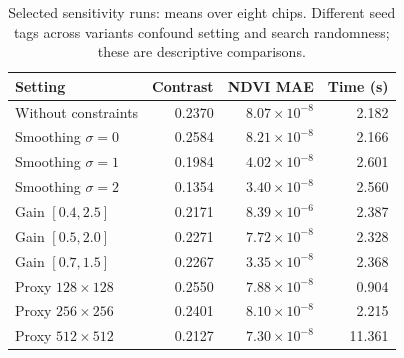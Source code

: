 \begin{table}[t]\centering\footnotesize
\caption{Selected sensitivity runs: means over eight chips. Different seed tags across variants confound setting and search randomness; these are descriptive comparisons.}
\label{tab:ablation}
\begin{tabular}{@{}lrrr@{}}\toprule
Setting & Contrast & NDVI MAE & Time (s) \\\midrule
Without constraints & 0.2370 & $8.07\times10^{-8}$ & 2.182 \\
Smoothing $\sigma=0$ & 0.2584 & $8.21\times10^{-8}$ & 2.166 \\
Smoothing $\sigma=1$ & 0.1984 & $4.02\times10^{-8}$ & 2.601 \\
Smoothing $\sigma=2$ & 0.1354 & $3.40\times10^{-8}$ & 2.560 \\
Gain $[0.4,2.5]$ & 0.2171 & $8.39\times10^{-6}$ & 2.387 \\
Gain $[0.5,2.0]$ & 0.2271 & $7.72\times10^{-8}$ & 2.328 \\
Gain $[0.7,1.5]$ & 0.2267 & $3.35\times10^{-8}$ & 2.368 \\
Proxy $128\times128$ & 0.2550 & $7.88\times10^{-8}$ & 0.904 \\
Proxy $256\times256$ & 0.2401 & $8.10\times10^{-8}$ & 2.215 \\
Proxy $512\times512$ & 0.2127 & $7.30\times10^{-8}$ & 11.361 \\
\bottomrule\end{tabular}\end{table}
